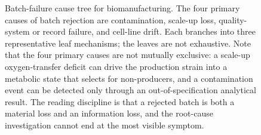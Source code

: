 \begin{figure}[htbp]
\caption{Batch-failure cause tree for biomanufacturing. The four
primary causes of batch rejection are contamination, scale-up loss,
quality-system or record failure, and cell-line drift. Each branches
into three representative leaf mechanisms; the leaves are not
exhaustive. Note that the four primary causes are not mutually
exclusive: a scale-up oxygen-transfer deficit can drive the production
strain into a metabolic state that selects for non-producers, and a
contamination event can be detected only through an out-of-specification
analytical result. The reading discipline is that a rejected batch is
both a material loss and an information loss, and the root-cause
investigation cannot end at the most visible symptom.}
\label{fig:vol06ch10:failure-tree}
\end{figure}
